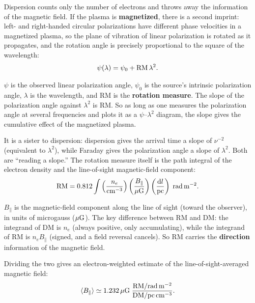 Dispersion counts only the number of electrons and throws away the information of the magnetic field. If the plasma is \textbf{magnetized}, there is a second imprint: left- and right-handed circular polarizations have different phase velocities in a magnetized plasma, so the plane of vibration of linear polarization is rotated as it propagates, and the rotation angle is precisely proportional to the square of the wavelength:
\begin{equation}
  \psi(\lambda)=\psi_0+{\rm RM}\,\lambda^2 .
  \label{eq:e21-rm-angle}
\end{equation}
\begin{formulaexplain}
\(\psi\) is the observed linear polarization angle, \(\psi_0\) is the source's intrinsic polarization angle, \(\lambda\) is the wavelength, and RM is the \textbf{rotation measure}. The slope of the polarization angle against \(\lambda^2\) is RM. So as long as one measures the polarization angle at several frequencies and plots it as a \(\psi\)--\(\lambda^2\) diagram, the slope gives the cumulative effect of the magnetized plasma.
\end{formulaexplain}
It is a sister to dispersion: dispersion gives the arrival time a slope of \(\nu^{-2}\) (equivalent to \(\lambda^2\)), while Faraday gives the polarization angle a slope of \(\lambda^2\). Both are ``reading a slope.'' The rotation measure itself is the path integral of the electron density and the line-of-sight magnetic-field component:
\begin{equation}
  {\rm RM}
  =
  0.812
  \int
  \left(\frac{n_e}{{\rm cm^{-3}}}\right)
  \left(\frac{B_\parallel}{\mu{\rm G}}\right)
  \left(\frac{{\rm d}l}{\rm pc}\right)
  \;{\rm rad\,m^{-2}} .
  \label{eq:e21-rm-definition}
\end{equation}
\begin{formulaexplain}
\(B_\parallel\) is the magnetic-field component along the line of sight (toward the observer), in units of microgauss (\(\mu{\rm G}\)). The key difference between RM and DM: the integrand of DM is \(n_e\) (always positive, only accumulating), while the integrand of RM is \(n_e B_\parallel\) (signed, and a field reversal cancels). So RM carries the \textbf{direction} information of the magnetic field.
\end{formulaexplain}
Dividing the two gives an electron-weighted estimate of the line-of-sight-averaged magnetic field:
\begin{equation}
  \langle B_\parallel\rangle
  \simeq
  1.232\,\mu{\rm G}\;
  \frac{{\rm RM}/{\rm rad\,m^{-2}}}{{\rm DM}/{\rm pc\,cm^{-3}}}.
  \label{eq:e21-bfield-rm-dm}
\end{equation}
